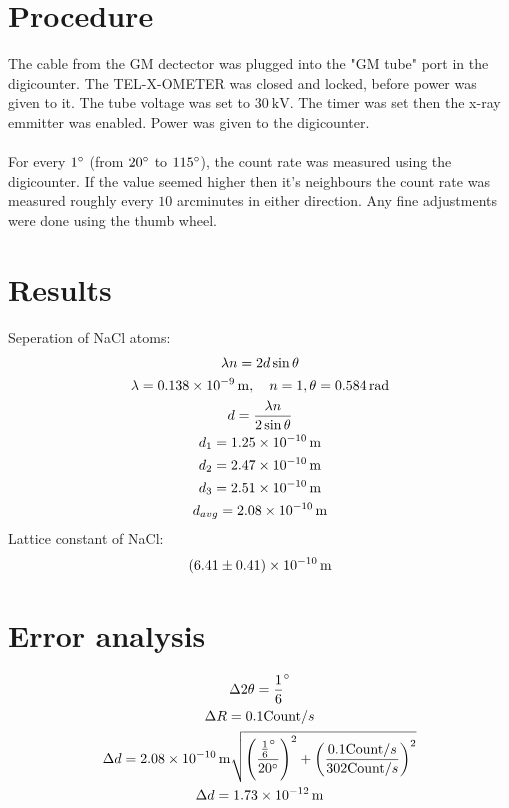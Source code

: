 \documentclass{article}
\begin{document}
    \section{Procedure}
        The cable from the GM dectector was plugged into the "GM tube" port in the digicounter. The TEL-X-OMETER was closed and locked, before power was given to it. The tube voltage was set to $\qty{30}{\kV}$. The timer was set then the x-ray emmitter was enabled. Power was given to the digicounter. \\~\\
        For every $1^\circ$ (from $20 ^\circ$ to $115 ^\circ$), the count rate was measured using the digicounter. If the value seemed higher then it's neighbours the count rate was measured roughly every $10$ arcminutes in either direction. Any fine adjustments were done using the thumb wheel.
    \section{Results}
        Seperation of NaCl atoms:
        \begin{gather*}
            \lambda n = 2d \sin \theta \\
            \lambda = \qty{0.138E-9}{\m}, \quad n = 1, \theta = \qty{0.584}{\radian} \\
            d = \frac {\lambda n}{2\sin \theta} \\
            d_1 = \qty{1.25E-10}{\m} \\
            d_2 = \qty{2.47E-10}{\m} \\
            d_3 = \qty{2.51E-10}{\m} \\
            d_{avg} = \qty{2.08E-10}{\m}
        \end{gather*}
        Lattice constant of NaCl:
        \begin{gather*}
            \qty{6.41(0.41)E-10}{\m}
        \end{gather*}
    \section{Error analysis}
       \begin{gather*}
        \Delta 2\theta = \frac 1 6 \degr \\
        \Delta R = 0.1 \text{Count}/s \\
        \Delta d =  \qty{2.08E-10}{\m}\sqrt{\left(\frac {\frac 1 6 \degr}{20 \degr}\right)^2 + \left(\frac {0.1\text{Count}/s}{302\text{Count}/s}\right)^2} \\
        \Delta d = \qty{1.73E-12}{\m}
       \end{gather*} 
\end{document}
